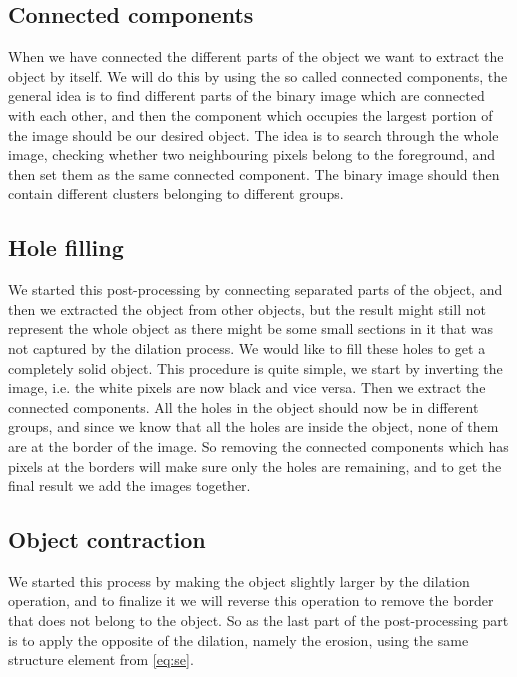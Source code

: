 \subsection{Connected components}

When we have connected the different parts of the object we want to extract the object by itself. We will do this by using the so called connected components, the general idea is to find different parts of the binary image which are connected with each other, and then the component which occupies the largest portion of the image should be our desired object. The idea is to search through the whole image, checking whether two neighbouring pixels belong to the foreground, and then set them as the same connected component. The binary image should then contain different clusters belonging to different groups.

\subsection{Hole filling}

We started this post-processing by connecting separated parts of the object, and then we extracted the object from other objects, but the result might still not represent the whole object as there might be some small sections in it that was not captured by the dilation process. We would like to fill these holes to get a completely solid object. This procedure is quite simple, we start by inverting the image, i.e. the white pixels are now black and vice versa. Then we extract the connected components. All the holes in the object should now be in different groups, and since we know that all the holes are inside the object, none of them are at the border of the image. So removing the connected components which has pixels at the borders will make sure only the holes are remaining, and to get the final result we add the images together.

\subsection{Object contraction}

We started this process by making the object slightly larger by the dilation operation, and to finalize it we will reverse this operation to remove the border that does not belong to the object. So as the last part of the post-processing part is to apply the opposite of the dilation, namely the erosion, using the same structure element from \eqref{eq:se}.
